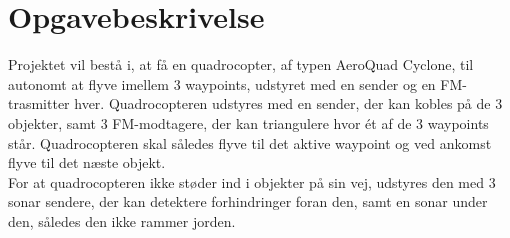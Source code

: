 \documentclass[Main]{subfiles}
\begin{document}
\chapter{Opgavebeskrivelse}
Projektet vil bestå i, at få en quadrocopter, af typen AeroQuad Cyclone, til autonomt at flyve imellem 3 waypoints, udstyret med en sender og en FM-trasmitter hver.
Quadrocopteren udstyres med en sender, der kan kobles på de 3 objekter, samt 3 FM-modtagere, der kan triangulere hvor ét af de 3 waypoints står. 
Quadrocopteren skal således flyve til det aktive waypoint og ved ankomst flyve til det næste objekt.
\\
For at quadrocopteren ikke støder ind i objekter på sin vej, udstyres den med 3 sonar sendere, der kan detektere forhindringer foran den, samt en sonar under den, således den ikke rammer jorden.
\end{document}
